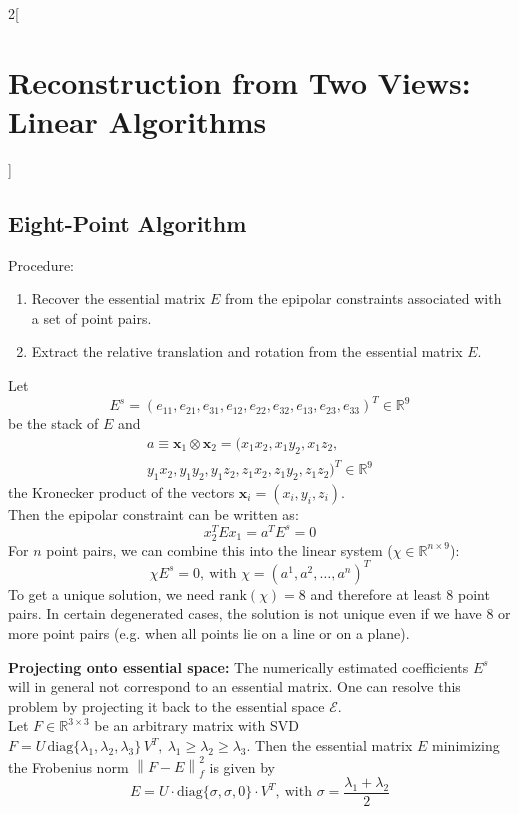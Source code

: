 \documentclass[oneside,fontsize=11pt,paper=a4]{scrartcl}
\begin{document}
\begin{multicols}{2}[\section{Reconstruction from Two Views: Linear Algorithms}]
\subsection{Eight-Point Algorithm}
Procedure:
\begin{enumerate}
    \item Recover the essential matrix $E$ from the epipolar constraints associated with a set of point pairs.
    \item Extract the relative translation and rotation from the essential matrix $E$.
\end{enumerate}
Let
\begin{equation*}
		E^s = (e_{11}, e_{21}, e_{31}, e_{12}, e_{22}, e_{32}, e_{13}, e_{23}, e_{33})^T \in \mathbb{R}^9   
\end{equation*}
be the stack of $E$ and
\begin{equation*}
\begin{split}
    a \equiv \boldsymbol{x}_1 \otimes \boldsymbol{x}_2 = (x_1x_2, x_1y_2, x_1z_2, \\ y_1x_2, y_1y_2, y_1z_2, z_1x_2, z_1y_2, z_1z_2)^T \in \mathbb{R}^9
\end{split}
\end{equation*}
the Kronecker product of the vectors $\boldsymbol{x}_i =(x_i,y_i,z_i)$. \\
Then the epipolar constraint can be written as:
\begin{equation*}
    x_2^T E x_1 = a^T E^s = 0
\end{equation*}
For $n$ point pairs, we can combine this into the linear system ($\chi \in \mathbb{R}^{n \times 9}$):
\begin{equation*}
    \chi E^s = 0, \ \text{with } \chi = (a^1, a^2, \dots, a^n)^T
\end{equation*}
To get a unique solution, we need $\text{rank}(\chi) = 8$ and therefore at least 8 point pairs.
In certain degenerated cases, the solution is not unique even if we have 8 or more point pairs (e.g. when all points lie on a line or on a plane).\\\par

\textbf{Projecting onto essential space:}
The numerically estimated coefficients $E^s$ will in general not correspond to an essential matrix. One can resolve this problem by projecting it back to the essential space $\mathcal{E}$.\\
Let $F \in \mathbb{R}^{3 \times 3}$ be an arbitrary matrix with SVD $F = U \, \text{diag}\{\lambda_1, \lambda_2, \lambda_3\} \, V^T, \ \lambda_1 \geq \lambda_2 \geq \lambda_3$.
Then the essential matrix $E$ minimizing the Frobenius norm $\left\| F - E \right\|_f^2$ is given by
\begin{equation*}
    E = U \cdot \text{diag}\{\sigma, \sigma, 0\} \cdot V^T, \ \text{with } \sigma = \frac{\lambda_1 + \lambda_2}{2} 
\end{equation*}

\end{multicols}
\end{document}

